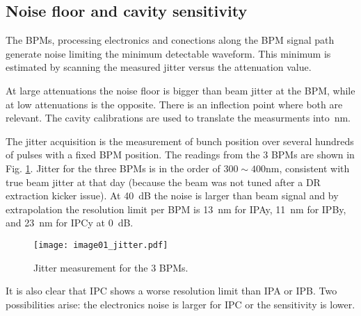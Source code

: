 \subsection{Noise floor and cavity sensitivity}
The BPMs, processing electronics and conections along the BPM signal path generate noise limiting the minimum detectable waveform. This minimum is estimated by scanning the measured jitter versus the attenuation value.\par
At large attenuations the noise floor is bigger than beam jitter at the BPM, while at low attenuations is the opposite. There is an inflection point where both are relevant. The cavity calibrations are used to translate the measurments into~nm.\par
The jitter acquisition is the measurement of bunch position over several hundreds of pulses with a fixed BPM position. 
The readings from the 3 BPMs are shown in Fig. \ref{f:resojitter}. Jitter for the three BPMs is in the order of $300\sim400$nm, consistent with true beam jitter at that day (because the beam was not tuned after a DR extraction kicker issue). At 40~dB the noise is larger than beam signal and by extrapolation the resolution limit per BPM is 13~nm for IPAy, 11~nm for IPBy, and 23~nm for IPCy at 0~dB.\par
\begin{figure}[!htb]
\centering%
 \texttt{[image: image01\_jitter.pdf]}\caption{Jitter measurement for the 3 BPMs.}\label{f:resojitter}
\end{figure}
It is also clear that IPC shows a worse resolution limit than IPA or IPB. Two possibilities arise: the electronics noise is larger for IPC or the sensitivity is lower.\par 
